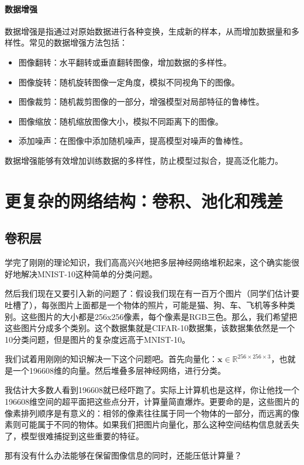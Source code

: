 \paragraph{数据增强}
数据增强是指通过对原始数据进行各种变换，生成新的样本，从而增加数据量和多样性。常见的数据增强方法包括：
\begin{itemize}
    \item 图像翻转：水平翻转或垂直翻转图像，增加数据的多样性。
    \item 图像旋转：随机旋转图像一定角度，模拟不同视角下的图像。
    \item 图像裁剪：随机裁剪图像的一部分，增强模型对局部特征的鲁棒性。
    \item 图像缩放：随机缩放图像大小，模拟不同距离下的图像。
    \item 添加噪声：在图像中添加随机噪声，提高模型对噪声的鲁棒性。
\end{itemize}
数据增强能够有效增加训练数据的多样性，防止模型过拟合，提高泛化能力。

\section{更复杂的网络结构：卷积、池化和残差}

\subsection{卷积层}

学完了刚刚的理论知识，我们高高兴兴地把多层神经网络堆积起来，这个确实能很好地解决MNIST-10这种简单的分类问题。

然后我们现在又要引入新的问题了：假设我们现在有一百万个图片（同学们估计要吐槽了），每张图片上面都是一个物体的照片，可能是猫、狗、车、飞机等多种类别。这些图片的大小都是256x256像素，每个像素是RGB三色。那么，我们希望把这些图片分成多个类别。这个数据集就是CIFAR-10数据集，该数据集依然是一个10分类问题，但是图片的复杂度远高于MNIST-10。

我们试着用刚刚的知识解决一下这个问题吧。首先向量化：$\mathbf{x} \in \mathbb{R}^{256 \times 256 \times 3}$，也就是一个196608维的向量。然后堆叠多层神经网络，进行分类。

我估计大多数人看到196608就已经吓跑了。实际上计算机也是这样，你让他找一个196608维空间的超平面把这些点分开，计算量简直爆炸。更要命的是，这些图片的像素排列顺序是有意义的：相邻的像素往往属于同一个物体的一部分，而远离的像素则可能属于不同的物体。如果我们把图片向量化，那么这种空间结构信息就丢失了，模型很难捕捉到这些重要的特征。

那有没有什么办法能够在保留图像信息的同时，还能压低计算量？

